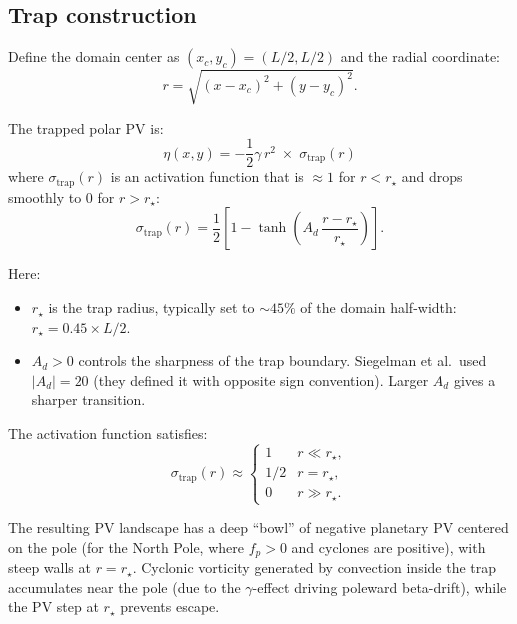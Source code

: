 \documentclass[11pt]{article}
\begin{document}
\subsection{Trap construction}

Define the domain center as $(x_c, y_c) = (L/2, L/2)$ and the radial coordinate:
\begin{equation}
r = \sqrt{(x - x_c)^2 + (y - y_c)^2}.
\end{equation}

The trapped polar PV is:
\begin{equation}
\boxed{\eta(x,y) = -\frac{1}{2}\gamma\,r^2 \;\times\; \sigma_{\mathrm{trap}}(r)}
\label{eq:eta_trap}
\end{equation}
where $\sigma_{\mathrm{trap}}(r)$ is an activation function that is $\approx 1$ for $r < r_\star$ and drops smoothly to $0$ for $r > r_\star$:
\begin{equation}
\sigma_{\mathrm{trap}}(r) = \frac{1}{2}\left[1 - \tanh\!\left(A_d\,\frac{r - r_\star}{r_\star}\right)\right].
\label{eq:sigma_trap}
\end{equation}

Here:
\begin{itemize}[nosep]
\item $r_\star$ is the trap radius, typically set to $\sim 45\%$ of the domain half-width: $r_\star = 0.45 \times L/2$.
\item $A_d > 0$ controls the sharpness of the trap boundary. Siegelman et al.\ used $|A_d| = 20$ (they defined it with opposite sign convention). Larger $A_d$ gives a sharper transition.
\end{itemize}

The activation function satisfies:
\begin{equation}
\sigma_{\mathrm{trap}}(r) \approx \begin{cases}
1 & r \ll r_\star, \\
1/2 & r = r_\star, \\
0 & r \gg r_\star.
\end{cases}
\end{equation}

The resulting PV landscape has a deep ``bowl'' of negative planetary PV centered on the pole (for the North Pole, where $f_p > 0$ and cyclones are positive), with steep walls at $r = r_\star$. Cyclonic vorticity generated by convection inside the trap accumulates near the pole (due to the $\gamma$-effect driving poleward beta-drift), while the PV step at $r_\star$ prevents escape.
\end{document}
